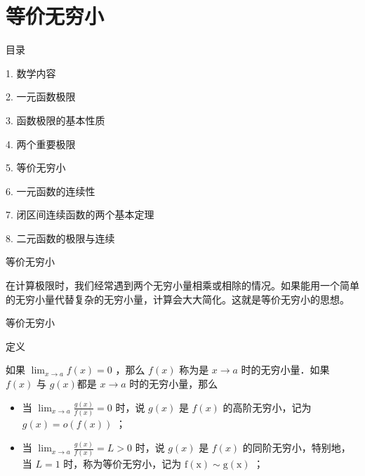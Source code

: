 \documentclass[aspectratio=169,10pt,fontset=fandol]{ctexbeamer}
\begin{document}
\section{等价无穷小}
\begin{frame}[t,fragile]{目录}
\normalsize
{\color{black}\normalsize 1. 数学内容\par}\vspace{0.3em}
{\color{black}\normalsize 2. 一元函数极限\par}\vspace{0.3em}
{\color{black}\normalsize 3. 函数极限的基本性质\par}\vspace{0.3em}
{\color{black}\normalsize 4. 两个重要极限\par}\vspace{0.3em}
{\color{blue}\normalsize 5. 等价无穷小\par}\vspace{0.3em}
{\color{gray!40}\normalsize 6. 一元函数的连续性\par}\vspace{0.3em}
{\color{gray!40}\normalsize 7. 闭区间连续函数的两个基本定理\par}\vspace{0.3em}
{\color{gray!40}\normalsize 8. 二元函数的极限与连续\par}\vspace{0.3em}
\end{frame}
\begin{frame}[t,fragile]{等价无穷小}
\normalsize
{\normalsize
在计算极限时，我们经常遇到两个无穷小量相乘或相除的情况。如果能用一个简单的无穷小量代替复杂的无穷小量，计算会大大简化。这就是等价无穷小的思想。


}
\end{frame}
\begin{frame}[t,fragile]{等价无穷小}
\normalsize
\begin{block}{定义}
{\normalsize

	如果 $\lim _{x \rightarrow a} f(x)=0$ ，那么 $f(x)$ 称为是 $x \rightarrow a$ 时的无穷小量．如果 $f(x)$ 与 $g(x)$都是 $x \rightarrow a$ 时的无穷小量，那么
	\begin{itemize}
		\item[1．] 当 $\lim _{x \rightarrow a} \frac{g(x)}{f(x)}=0$ 时，说 $g(x)$ 是 $f(x)$ 的高阶无穷小，记为 $g(x)=o(f(x))$ ；
		\item[2．] 当 $\lim _{x \rightarrow a} \frac{g(x)}{f(x)}=L>0$ 时，说 $g(x)$ 是 $f(x)$ 的同阶无穷小，特别地，当 $L=1$ 时，称为等价无穷小，记为 $\mathrm{f}(\mathrm{x}) \sim \mathrm{g}(\mathrm{x})$ ；
	\end{itemize}


}
\end{block}
\end{frame}
\end{document}
